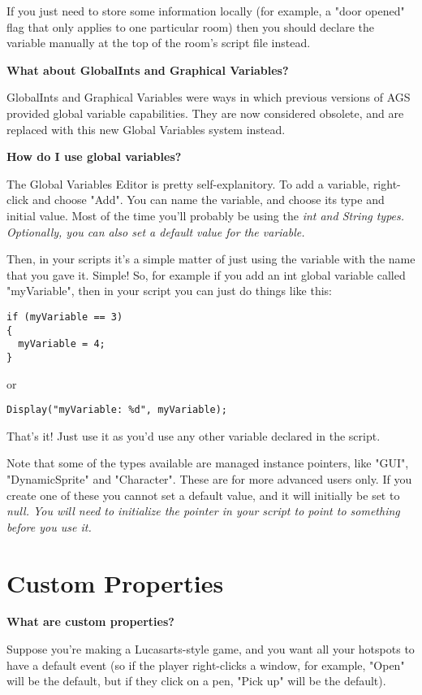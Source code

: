 If you just need to store some information locally (for example, a "door opened" flag
that only applies to one particular room) then you should declare the variable
manually at the top of the room's script file instead.

\bf{What about GlobalInts and Graphical Variables?}

GlobalInts and Graphical Variables were ways in which previous versions of AGS
provided global variable capabilities. They are now considered obsolete, and are
replaced with this new Global Variables system instead.

\bf{How do I use global variables?}

The Global Variables Editor is pretty self-explanitory. To add a variable, right-click
and choose "Add". You can name the variable, and choose its type and initial value.
Most of the time you'll probably be using the \it{int} and \it{String} types. Optionally,
you can also set a default value for the variable.

Then, in your scripts it's a simple matter of just using the variable with the name
that you gave it. Simple! So, for example if you add an int global variable called
"myVariable", then in your script you can just do things like this:

\begin{verbatim}
if (myVariable == 3)
{
  myVariable = 4;
}
\end{verbatim}

or

\verb$Display("myVariable: %d", myVariable);$

That's it! Just use it as you'd use any other variable declared in the script.

Note that some of the types available are managed instance pointers, like "GUI",
"DynamicSprite" and "Character". These are for more advanced users only.
If you create one of these you cannot set a default value, and it will initially
be set to \it{null}. You will need to initialize the pointer in your script to
point to something before you use it.


\section{Custom Properties}%

\bf{What are custom properties?}

Suppose you're making a Lucasarts-style game, and you want all your hotspots to have
a default event (so if the player right-clicks a window, for example, "Open" will be
the default, but if they click on a pen, "Pick up" will be the default).


